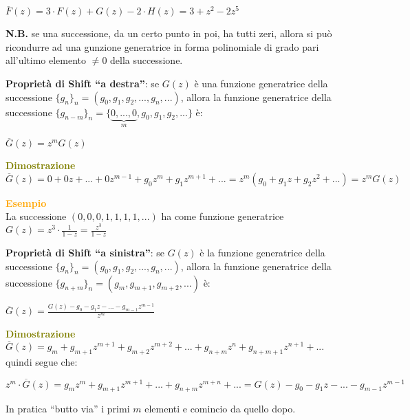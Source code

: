 \begin{flushleft}
\begin{boxA}
        {\centering
            $\overline{F}(z) = 3 \cdot F(z) + G(z) - 2 \cdot H(z) = 3 + z^2 - 2z^5$
        \par}
    \end{boxA}
    \textbf{N.B.} se una successione, da un certo punto in poi, ha tutti zeri, allora si può ricondurre ad una gunzione generatrice in forma polinomiale di grado pari all'ultimo elemento $\neq 0$ della successione.
\end{flushleft}
\begin{flushleft}
    \textbf{Proprietà di Shift ``a destra''}: se $G(z)$ è una funzione generatrice della successione $\{g_n\}_n = (g_0, g_1, g_2, ..., g_n, ...)$, allora la funzione generatrice della successione $\{g_{n-m}\}_n = \{\underset{m}{\underbrace{0, ..., 0}}, g_0, g_1, g_2, ...\}$ è:

    {\centering
        $\overline{G}(z) = z^mG(z)$
    \par}
    
    \begin{boxA}
        \textcolor{olive}{\textbf{Dimostrazione}} \\
        $\overline{G}(z) = 0 + 0z + ... + 0z^{m-1} + g_0z^m + g_1z^{m+1} + ... = z^m(g_0 + g_1z + g_2z^2 + ...) = z^mG(z)$
    \end{boxA}
    \begin{boxA}
        \textcolor{orange}{\textbf{Esempio}} \\
        La successione $(0, 0, 0, 1, 1, 1, 1, ...)$ ha come funzione generatrice $G(z) = z^3 \cdot \frac{1}{1-z} = \frac{z^3}{1-z}$
    \end{boxA}
\end{flushleft}

\begin{flushleft}
    \textbf{Proprietà di Shift ``a sinistra''}: se $G(z)$ è la funzione generatrice della successione $\{g_n\}_n = (g_0, g_1, g_2, ..., g_n, ...)$, allora la funzione generatrice della successione $\{g_{n+m}\}_n = (g_m, g_{m+1}, g_{m+2}, ...)$ è:

    {\centering
        $\overline{G}(z) = \frac{G(z) - g_0 - g_1z - ... - g_{m-1}z^{m-1}}{z^m}$
    \par}
    \begin{boxA}
        \textcolor{olive}{\textbf{Dimostrazione}} \\
        $\overline{G}(z) = g_m + g_{m+1}z^{m+1} + g_{m+2}z^{m+2} + ... + g_{n+m}z^n + g_{n+m+1}z^{n+1} + ...$ quindi segue che:

        {\centering
            $z^m \cdot \overline{G}(z) = g_mz^m + g_{m+1}z^{m+1} + ... + g_{n+m}z^{m+n} + ... = G(z) - g_0 - g_1z - ... - g_{m-1}z^{m-1}$
        \par}
    \end{boxA}
    In pratica ``butto via'' i primi $m$ elementi e comincio da quello dopo.
\end{flushleft}

